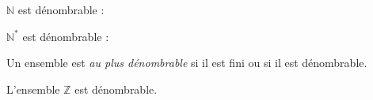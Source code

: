 \documentclass[a4paper,10pt]{report}
\begin{document}
\medskip

\begin{exems}
\item $\mathbb{N}$ est dénombrable : 
\item $\mathbb{N}^*$ est dénombrable : 
\end{exems}

\medskip

\begin{Definition}{} Un ensemble est \emph{au plus dénombrable} si il est fini ou si il est dénombrable.
\end{Definition}

\begin{Proposition}{} L'ensemble $\mathbb{Z}$ est dénombrable.
\end{Proposition}

\begin{Demonstration}{} 
%
\vspace{8.5cm}
\end{Demonstration}

\newpage
\end{document}

